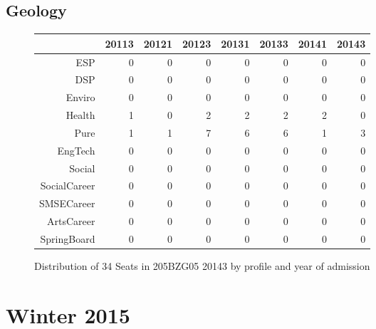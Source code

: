 \documentclass{article}\usepackage[]{graphicx}\usepackage[]{color}
\begin{document}
\subsection{Geology}
\begin{figure}[H]
\centering
\begin{tabular}{rrrrrrrr}
  \hline
 & 20113 & 20121 & 20123 & 20131 & 20133 & 20141 & 20143 \\ 
  \hline
ESP &   0 &   0 &   0 &   0 &   0 &   0 &   0 \\ 
  DSP &   0 &   0 &   0 &   0 &   0 &   0 &   0 \\ 
  Enviro &   0 &   0 &   0 &   0 &   0 &   0 &   0 \\ 
  Health &   1 &   0 &   2 &   2 &   2 &   2 &   0 \\ 
  Pure &   1 &   1 &   7 &   6 &   6 &   1 &   3 \\ 
  EngTech &   0 &   0 &   0 &   0 &   0 &   0 &   0 \\ 
  Social &   0 &   0 &   0 &   0 &   0 &   0 &   0 \\ 
  SocialCareer &   0 &   0 &   0 &   0 &   0 &   0 &   0 \\ 
  SMSECareer &   0 &   0 &   0 &   0 &   0 &   0 &   0 \\ 
  ArtsCareer &   0 &   0 &   0 &   0 &   0 &   0 &   0 \\ 
  SpringBoard &   0 &   0 &   0 &   0 &   0 &   0 &   0 \\ 
   \hline
\end{tabular}
\caption{Distribution of 34 Seats in 205BZG05 20143 by profile and year of admission} 
\end{figure}



\section{Winter 2015}
\end{document}
